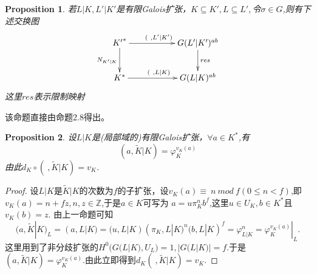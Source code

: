 \documentclass[UTF8]{article}
\newtheorem{prop}{Proposition}[section]
\begin{document}
\begin{prop}
	若$L|K,L'|K'$是有限Galois扩张，$K\subseteq K',L\subseteq L',$令$\sigma\in G$,则有下述交换图
	$$
	\xymatrix{
{K'}^{*}\ar[rr]^{(\ ,L'|K')}\ar[d]_{N_{K'|K}}& &G(L'|K')^{ab}\ar[d]^{res}\\
K^{*}\ar[rr]^{(\ ,L|K)}&&G(L|K)^{ab}	
}
$$
这里$res$表示限制映射	
\end{prop}
该命题直接由命题2.8得出。\\
\begin{prop}
	设$L|K$是(局部域的)有限Galois扩张，$\forall a\in K^{*}$,有
	$$(a,\widetilde{K}|K)=\varphi_{K}^{v_{K}(a)}$$
	由此$d_{K}\circ (\ ,\widetilde{K}|K)=v_{K}$.
\end{prop}
\begin{proof}

设$L|K$是$\widetilde{K}|K$的次数为$f$的子扩张，设$v_{K}(a)\equiv \ n\ mod \ f(0\leq n<f)$,即$v_{K}(a)=n+fz,n,z\in \mathbb{Z}$,于是$a\in K$可写为
$a=u\pi_{K}^{n}b^{f}$,这里$u\in U_{K},b\in K^{*}$且$v_{K}(b)=z.$
由上一命题可知
$$
(a,\widetilde{K}|K)_{L}=(a,L|K)=(u,L|K)(\pi_{K},L|K)^{n}(b,L|K)^{f}=\varphi_{L|K}^{n}=\varphi_{K}^{v_{K}(a)}|_{L}.
$$
这里用到了非分歧扩张的$H^{0}(G(L|K),U_{L})=1,|G(L|K)|=f$.于是
$(a,\widetilde{K}|K)=\varphi_{K}^{v_{K}(a)}.$由此立即得到$d_{K}(\ ,\widetilde{K}|K)=v_{K}.$
\end{proof}
\end{document}
